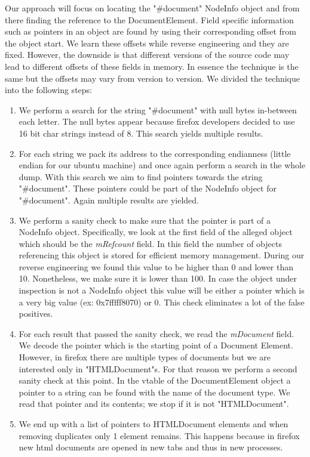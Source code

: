 Our approach will focus on locating the "\#document" NodeInfo object and from there finding the reference to the DocumentElement. Field specific information such as pointers in an object are found by using their corresponding offset from the object start. We learn these offsets while reverse engineering and they are fixed. However, the downside is that different versions of the source code may lead to different offsets of these fields in memory. In essence the technique is the same but the offsets may vary from version to version. We divided the technique into the following steps:

\begin{enumerate}
	\item We perform a search for the string "\#document" with null bytes in-between each letter. The null bytes appear because firefox developers decided to use 16 bit char strings instead of 8. This search yields multiple results.
	\item For each string we pack its address to the corresponding endianness (little endian for our ubuntu machine) and once again perform a search in the whole dump. With this search we aim to find pointers towards the string "\#document". These pointers could be part of the NodeInfo object for "\#document". Again multiple results are yielded.
	\item We perform a sanity check to make sure that the pointer is part of a NodeInfo object. Specifically, we look at the first field of the alleged object which should be the \textit{mRefcount} field. In this field the number of objects referencing this object is stored for efficient memory management. During our reverse engineering we found this value to be higher than 0 and lower than 10. Nonetheless, we make sure it is lower than 100. In case the object under inspection is not a NodeInfo object this value will be either a pointer which is a very big value (ex: 0x7fffff8070) or 0. This check eliminates a lot of the false positives.
	\item For each result that passed the sanity check, we read the \textit{mDocument} field. We decode the pointer which is the starting point of a Document Element. However, in firefox there are multiple types of documents but we are interested only in "HTMLDocument"s. For that reason we perform a second sanity check at this point. In the vtable of the DocumentElement object a pointer to a string can be found with the name of the document type. We read that pointer and its contents; we stop if it is not "HTMLDocument".
	\item We end up with a list of pointers to HTMLDocument elements and when removing duplicates only 1 element remains. This happens because in firefox new html documents are opened in new tabs and thus in new processes.
\end{enumerate}

